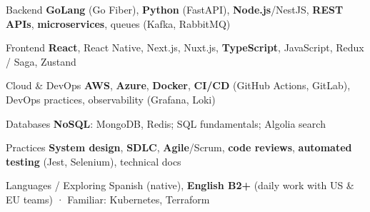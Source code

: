
\begin{cvskills}

  \cvskill
  {Backend}
  {\textbf{GoLang} (Go Fiber), \textbf{Python} (FastAPI), \textbf{Node.js}/NestJS, \textbf{REST APIs}, \textbf{microservices}, queues (Kafka, RabbitMQ)}

  \cvskill
  {Frontend}
  {\textbf{React}, React Native, Next.js, Nuxt.js, \textbf{TypeScript}, JavaScript, Redux / Saga, Zustand}

  \cvskill
  {Cloud \& DevOps}
  {\textbf{AWS}, \textbf{Azure}, \textbf{Docker}, \textbf{CI/CD} (GitHub Actions, GitLab), DevOps practices, observability (Grafana, Loki)}

  \cvskill
  {Databases}
  {\textbf{NoSQL}: MongoDB, Redis; SQL fundamentals; Algolia search}

  \cvskill
  {Practices}
  {\textbf{System design}, \textbf{SDLC}, \textbf{Agile}/Scrum, \textbf{code reviews}, \textbf{automated testing} (Jest, Selenium), technical docs}

  \cvskill
  {Languages / Exploring}
  {Spanish (native), \textbf{English B2+} (daily work with US \& EU teams) · Familiar: Kubernetes, Terraform}

\end{cvskills}
